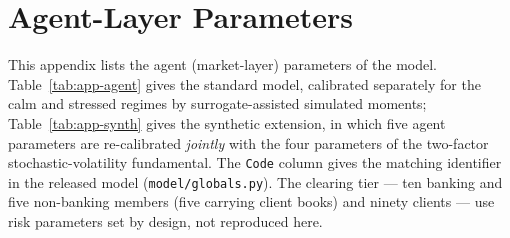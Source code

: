
\section{Agent-Layer Parameters}\label{app:params}
This appendix lists the agent (market-layer) parameters of the model. Table~\ref{tab:app-agent} gives the
standard model, calibrated separately for the calm and stressed regimes by surrogate-assisted simulated
moments;  Table~\ref{tab:app-synth}
gives the synthetic extension, in which five agent parameters are re-calibrated \emph{jointly} with the four
parameters of the two-factor stochastic-volatility fundamental. The \texttt{Code} column gives the matching
identifier in the released model (\texttt{model/globals.py}). The clearing tier --- ten banking and five
non-banking members (five carrying client books) and ninety clients --- use risk parameters set by design,
not reproduced here.


